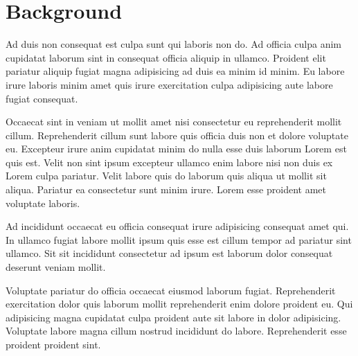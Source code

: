 \section{Background}
Ad duis non consequat est culpa sunt qui laboris non do. Ad officia culpa anim cupidatat laborum sint in consequat officia aliquip in ullamco. Proident elit pariatur aliquip fugiat magna adipisicing ad duis ea minim id minim. Eu labore irure laboris minim amet quis irure exercitation culpa adipisicing aute labore fugiat consequat.

Occaecat sint in veniam ut mollit amet nisi consectetur eu reprehenderit mollit cillum. Reprehenderit cillum sunt labore quis officia duis non et dolore voluptate eu. Excepteur irure anim cupidatat minim do nulla esse duis laborum Lorem est quis est. Velit non sint ipsum excepteur ullamco enim labore nisi non duis ex Lorem culpa pariatur. Velit labore quis do laborum quis aliqua ut mollit sit aliqua. Pariatur ea consectetur sunt minim irure. Lorem esse proident amet voluptate laboris.

Ad incididunt occaecat eu officia consequat irure adipisicing consequat amet qui. In ullamco fugiat labore mollit ipsum quis esse est cillum tempor ad pariatur sint ullamco. Sit sit incididunt consectetur ad ipsum est laborum dolor consequat deserunt veniam mollit.

Voluptate pariatur do officia occaecat eiusmod laborum fugiat. Reprehenderit exercitation dolor quis laborum mollit reprehenderit enim dolore proident eu. Qui adipisicing magna cupidatat culpa proident aute sit labore in dolor adipisicing. Voluptate labore magna cillum nostrud incididunt do labore. Reprehenderit esse proident proident sint.